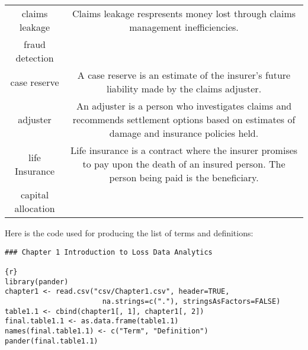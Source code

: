 \documentclass[
]{book}
\begin{document}
\begin{longtable}[]{@{}cc@{}}
\begin{minipage}[t]{0.39\columnwidth}
claims leakage\strut
\end{minipage} & \begin{minipage}[t]{0.43\columnwidth}\centering
Claims leakage respresents
money lost through claims
management inefficiencies.\strut
\end{minipage}\tabularnewline
\begin{minipage}[t]{0.39\columnwidth}\centering
fraud detection\strut
\end{minipage} & \begin{minipage}[t]{0.43\columnwidth}\centering
\strut
\end{minipage}\tabularnewline
\begin{minipage}[t]{0.39\columnwidth}\centering
case reserve\strut
\end{minipage} & \begin{minipage}[t]{0.43\columnwidth}\centering
A case reserve is an estimate
of the insurer's future
liability made by the claims
adjuster.\strut
\end{minipage}\tabularnewline
\begin{minipage}[t]{0.39\columnwidth}\centering
adjuster\strut
\end{minipage} & \begin{minipage}[t]{0.43\columnwidth}\centering
An adjuster is a person who
investigates claims and
recommends settlement options
based on estimates of damage
and insurance policies held.\strut
\end{minipage}\tabularnewline
\begin{minipage}[t]{0.39\columnwidth}\centering
life Insurance\strut
\end{minipage} & \begin{minipage}[t]{0.43\columnwidth}\centering
Life insurance is a contract
where the insurer promises to
pay upon the death of an
insured person. The person
being paid is the beneficiary.\strut
\end{minipage}\tabularnewline
\begin{minipage}[t]{0.39\columnwidth}\centering
capital allocation\strut
\end{minipage} & \begin{minipage}[t]{0.43\columnwidth}\centering
\strut
\end{minipage}\tabularnewline
\bottomrule
\end{longtable}

Here is the code used for producing the list of terms and definitions:

\begin{verbatim}
### Chapter 1 Introduction to Loss Data Analytics

{r}
library(pander)
chapter1 <- read.csv("csv/Chapter1.csv", header=TRUE,
                       na.strings=c("."), stringsAsFactors=FALSE)
table1.1 <- cbind(chapter1[, 1], chapter1[, 2])
final.table1.1 <- as.data.frame(table1.1)
names(final.table1.1) <- c("Term", "Definition")
pander(final.table1.1)
\end{verbatim}
\end{document}
